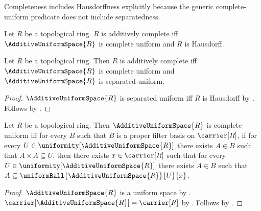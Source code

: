 Completeness includes Hausdorffness explicitly because the generic
complete-uniform predicate does not include separatedness.

\begin{definition}\label{additively_complete_topological_ring}
    Let $R$ be a topological ring.
    $R$ is additively complete iff
        $\AdditiveUniformSpace{R}$ is complete uniform and
        $R$ is Hausdorff.
\end{definition}

\begin{theorem}\label{additively_complete_iff_complete_separated}
    Let $R$ be a topological ring.
    Then $R$ is additively complete iff
        $\AdditiveUniformSpace{R}$ is complete uniform and
        $\AdditiveUniformSpace{R}$ is separated uniform.
\end{theorem}
\begin{proof}
    $\AdditiveUniformSpace{R}$ is separated uniform iff
        $R$ is Hausdorff by
        .
    Follows by .
\end{proof}

\begin{theorem}\label{additive_uniform_complete_iff_filter_basis_convergence}
    Let $R$ be a topological ring.
    Then $\AdditiveUniformSpace{R}$ is complete uniform iff
        for every $B$ such that
            $B$ is a proper filter basis on $\carrier[R]$, if
            for every $U\in\uniformity[\AdditiveUniformSpace{R}]$ there
                exists $A\in B$ such that $A\times A\subseteq U$, then
            there exists $x\in\carrier[R]$ such that for every
                $U\in\uniformity[\AdditiveUniformSpace{R}]$ there exists
                $A\in B$ such that
                    $A\subseteq\uniformBall{\AdditiveUniformSpace{R}}{U}{x}$.
\end{theorem}
\begin{proof}
    $\AdditiveUniformSpace{R}$ is a uniform space by
        .
    $\carrier[\AdditiveUniformSpace{R}]=\carrier[R]$ by
        .
    Follows by .
\end{proof}

